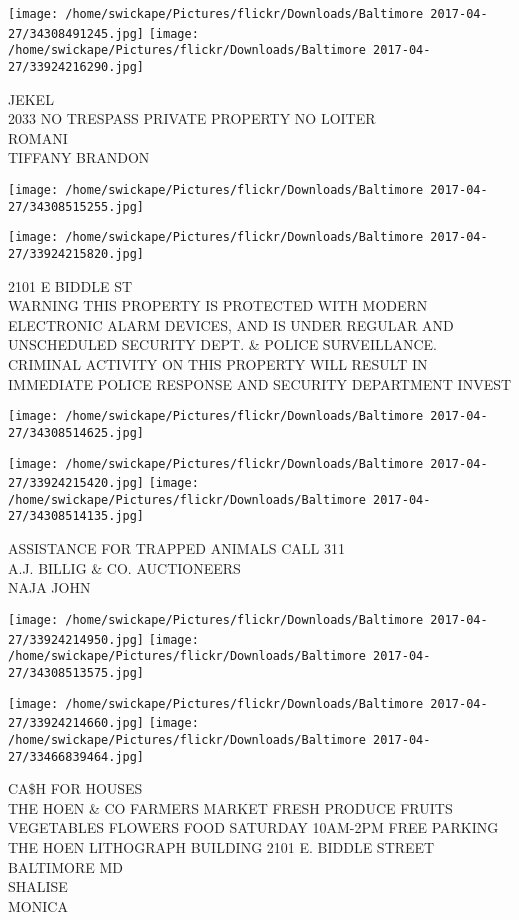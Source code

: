 \documentclass[10pt,letterpaper]{article}
\begin{document}
\texttt{[image: /home/swickape/Pictures/flickr/Downloads/Baltimore 2017-04-27/34308491245.jpg]}
\texttt{[image: /home/swickape/Pictures/flickr/Downloads/Baltimore 2017-04-27/33924216290.jpg]}

JEKEL\\
2033 NO TRESPASS PRIVATE PROPERTY NO LOITER\\
ROMANI\\
TIFFANY BRANDON\\
\pagebreak

\texttt{[image: /home/swickape/Pictures/flickr/Downloads/Baltimore 2017-04-27/34308515255.jpg]}

\vspace{0.25in}
\texttt{[image: /home/swickape/Pictures/flickr/Downloads/Baltimore 2017-04-27/33924215820.jpg]}

2101 E BIDDLE ST\\
WARNING THIS PROPERTY IS PROTECTED WITH MODERN ELECTRONIC ALARM DEVICES, AND IS UNDER REGULAR AND UNSCHEDULED SECURITY DEPT. \& POLICE SURVEILLANCE.  CRIMINAL ACTIVITY ON THIS PROPERTY WILL RESULT IN IMMEDIATE POLICE RESPONSE AND SECURITY DEPARTMENT INVEST\\
\pagebreak

\texttt{[image: /home/swickape/Pictures/flickr/Downloads/Baltimore 2017-04-27/34308514625.jpg]}

\vspace{0.25in}
\texttt{[image: /home/swickape/Pictures/flickr/Downloads/Baltimore 2017-04-27/33924215420.jpg]}
\texttt{[image: /home/swickape/Pictures/flickr/Downloads/Baltimore 2017-04-27/34308514135.jpg]}

ASSISTANCE FOR TRAPPED ANIMALS CALL 311\\
A.J. BILLIG \& CO. AUCTIONEERS\\
NAJA JOHN\\
\pagebreak

\texttt{[image: /home/swickape/Pictures/flickr/Downloads/Baltimore 2017-04-27/33924214950.jpg]}
\texttt{[image: /home/swickape/Pictures/flickr/Downloads/Baltimore 2017-04-27/34308513575.jpg]}

\texttt{[image: /home/swickape/Pictures/flickr/Downloads/Baltimore 2017-04-27/33924214660.jpg]}
\texttt{[image: /home/swickape/Pictures/flickr/Downloads/Baltimore 2017-04-27/33466839464.jpg]}

CA\$H FOR HOUSES\\
THE HOEN \& CO FARMERS MARKET  FRESH PRODUCE FRUITS VEGETABLES FLOWERS FOOD SATURDAY 10AM{-}2PM FREE PARKING THE HOEN LITHOGRAPH BUILDING 2101 E. BIDDLE STREET BALTIMORE MD\\
SHALISE\\
MONICA\\
\pagebreak
\end{document}
